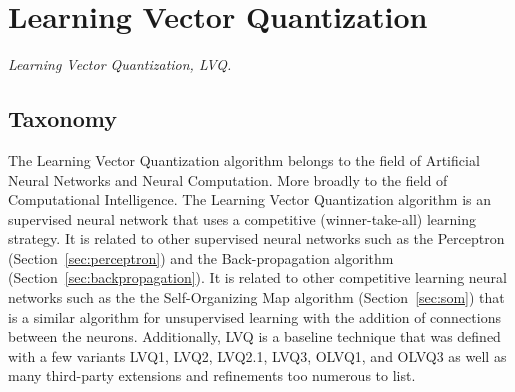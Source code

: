 

\section{Learning Vector Quantization} 
\label{sec:lvq}

\emph{Learning Vector Quantization, LVQ.}

\subsection{Taxonomy}
The Learning Vector Quantization algorithm belongs to the field of Artificial Neural Networks and Neural Computation. More broadly to the field of Computational Intelligence.  
The Learning Vector Quantization algorithm is an supervised neural network that uses a competitive (winner-take-all) learning strategy.
It is related to other supervised neural networks such as the Perceptron (Section~\ref{sec:perceptron}) and the Back-propagation algorithm (Section~\ref{sec:backpropagation}).
It is related to other competitive learning neural networks such as the the Self-Organizing Map algorithm (Section~\ref{sec:som}) that is a similar algorithm for unsupervised learning with the addition of connections between the neurons.
Additionally, LVQ is a baseline technique that was defined with a few variants LVQ1, LVQ2, LVQ2.1, LVQ3, OLVQ1, and OLVQ3 as well as many third-party extensions and refinements too numerous to list.

